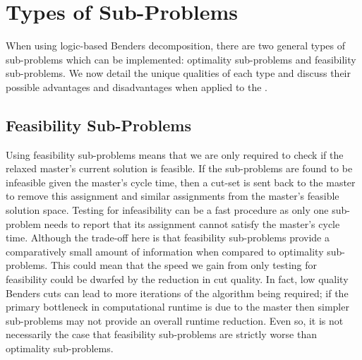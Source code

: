 


\section{Types of Sub-Problems}
\label{sec:bend:SPtype}
When using logic-based Benders decomposition, there are two general types 
of sub-problems which can be implemented: optimality sub-problems and 
feasibility sub-problems.
We now detail the unique qualities of each 
type and discuss their possible advantages and disadvantages when 
applied to the .

\subsection{Feasibility Sub-Problems}
\label{sec:bend:SPfeas}
Using feasibility sub-problems means that we are only required to check if 
the relaxed master's current solution is feasible.
If the sub-problems are found to be infeasible given the master's cycle time, 
then a cut-set is sent back to the master to remove
this assignment and similar assignments from the master's feasible solution space.
Testing for infeasibility can be a fast procedure as only
one sub-problem needs to report that its assignment cannot
satisfy the master's cycle time.
Although the trade-off here is that feasibility sub-problems
provide a comparatively small amount of information when compared to optimality sub-problems.
This could mean that the speed we gain from only testing for
feasibility could be dwarfed by the reduction in cut quality.
In fact, low quality Benders cuts can lead to more iterations of
the algorithm being required; if the primary bottleneck in computational runtime
is due to the master then simpler sub-problems may not
provide an overall runtime reduction.
Even so, it is not necessarily the case that feasibility sub-problems 
are strictly worse than optimality sub-problems.

